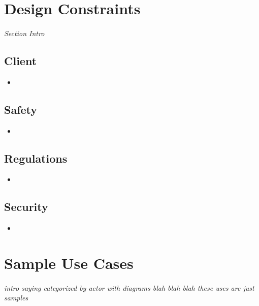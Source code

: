 \documentclass[12pt]{article}
\begin{document}
\section{Design Constraints} \label{cons} %
\paragraph{} \textit{Section Intro}

	\subsection{Client}
	\begin{itemize}
		\item 
	\end{itemize}

	\subsection{Safety}
	\begin{itemize}
		\item 
	\end{itemize}

	\subsection{Regulations}
	\begin{itemize}
		\item 
	\end{itemize}

	\subsection{Security}
	\begin{itemize}
		\item 
	\end{itemize}

\section{Sample Use Cases}
\paragraph{} \textit{intro saying categorized by actor with diagrams blah blah blah these uses are just samples}
\end{document}
